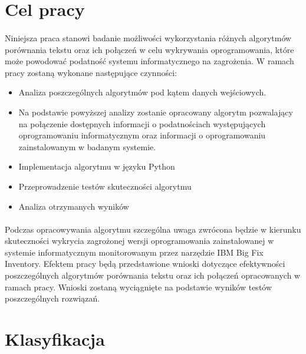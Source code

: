 \documentclass[a4paper,12pt,twoside]{article}
\begin{document}
\paragraph{}



\newpage
\section*{Cel pracy}
\paragraph{}
Niniejsza praca stanowi badanie możliwości wykorzystania różnych algorytmów porównania tekstu oraz ich połączeń w celu wykrywania oprogramowania, które może powodować podatność systemu informatycznego na zagrożenia. W ramach pracy zostaną wykonane następujące czynności:
\begin{itemize}
\item Analiza poszczególnych algorytmów pod kątem danych wejściowych. 
\item Na podstawie powyższej analizy zostanie opracowany algorytm pozwalający na połączenie dostępnych informacji o podatnościach występujących oprogramowaniu informatycznym oraz informacji o oprogramowaniu zainstalowanym w badanym systemie.
\item Implementacja algorytmu w języku Python
\item Przeprowadzenie testów skuteczności algorytmu
\item Analiza otrzymanych wyników
\end{itemize}
\paragraph{}
Podczas opracowywania algorytmu szczególna uwaga zwrócona będzie w kierunku skuteczności wykrycia zagrożonej wersji oprogramowania zainstalowanej w systemie informatycznym monitorowanym przez narzędzie IBM Big Fix Inventory. Efektem pracy będą przedstawione wnioski dotyczące efektywności poszczególnych algorytmów porównania tekstu oraz ich połączeń opracowanych w ramach pracy. Wnioski zostaną wyciągnięte na podstawie wyników testów poszczególnych rozwiązań.
\newpage
\thispagestyle{empty}
\mbox{}

\newpage
\section{Klasyfikacja}
\end{document}
